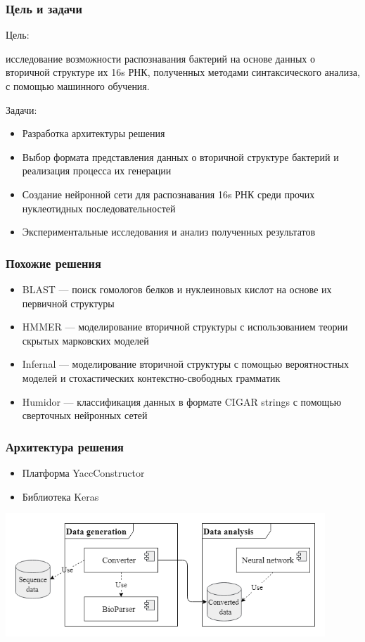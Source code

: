 \documentclass{beamer}
\begin{document}
\begin{frame}\frametitle{Цель и задачи}
Цель: 

исследование возможности распознавания бактерий на основе данных о вторичной структуре их 16s РНК, полученных методами синтаксического анализа, с помощью машинного обучения.

\vspace{5\onelineskip}

Задачи:
\begin{itemize}
    \item Разработка архитектуры решения
    \item Выбор формата представления данных о вторичной структуре бактерий и реализация процесса их генерации
    \item Создание нейронной сети для распознавания 16s РНК среди прочих нуклеотидных последовательностей
    \item Экспериментальные исследования и анализ полученных результатов
\end{itemize}
\end{frame}

\begin{frame}\frametitle{Похожие решения}

\begin{itemize}
    \item BLAST --- поиск гомологов белков и нуклеиновых кислот на основе их первичной структуры
    \item HMMER --- моделирование вторичной структуры с использованием теории скрытых марковских моделей
    \item Infernal --- моделирование вторичной структуры с помощью вероятностных моделей и стохастических контекстно-свободных грамматик
    \item Humidor --- классификация данных в формате CIGAR strings с помощью сверточных нейронных сетей
\end{itemize}
\end{frame}

\begin{frame}\frametitle{Архитектура решения}
\begin{itemize}
    \item Платформа YaccConstructor
    \item Библиотека Keras
\end{itemize}
\includegraphics[width=12cm]{architecture.png}
\end{frame}
\end{document}
